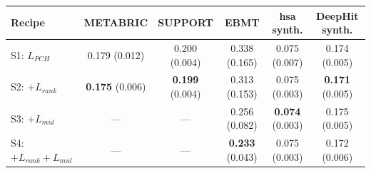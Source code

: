\begin{tabular}{lccccc}
\toprule
Recipe & METABRIC & SUPPORT & EBMT & hsa synth. & DeepHit synth. \\
\midrule
S1: $L_{PCH}$ & 0.179 (0.012) & 0.200 (0.004) & 0.338 (0.165) & 0.075 (0.007) & 0.174 (0.005) \\
S2: $+L_{rank}$ & \textbf{0.175} (0.006) & \textbf{0.199} (0.004) & 0.313 (0.153) & 0.075 (0.003) & \textbf{0.171} (0.005) \\
S3: $+L_{mul}$ & --- & --- & 0.256 (0.082) & \textbf{0.074} (0.003) & 0.175 (0.005) \\
S4: $+L_{rank}+L_{mul}$ & --- & --- & \textbf{0.233} (0.043) & 0.075 (0.003) & 0.172 (0.006) \\
\bottomrule
\end{tabular}
